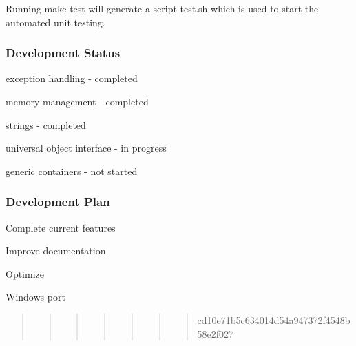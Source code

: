 Running \textquotesingle{}make test\textquotesingle{} will generate a script \textquotesingle{}test.\+sh\textquotesingle{} which is used to start the automated unit testing. 

\subsubsection*{Development Status}


\begin{DoxyItemize}
\item exception handling -\/ completed 
\item memory management -\/ completed 
\item strings -\/ completed 
\item universal object interface -\/ in progress 
\item generic containers -\/ not started 
\end{DoxyItemize}\subsubsection*{Development Plan}


\begin{DoxyEnumerate}
\item Complete current features 
\item Improve documentation 
\item Optimize 
\item Windows port 
\end{DoxyEnumerate}\begin{quote}
\begin{quote}
\begin{quote}
\begin{quote}
\begin{quote}
\begin{quote}
\begin{quote}
cd10e71b5c634014d54a947372f4548b58e2f027\end{quote}
\end{quote}
\end{quote}
\end{quote}
\end{quote}
\end{quote}
\end{quote}
